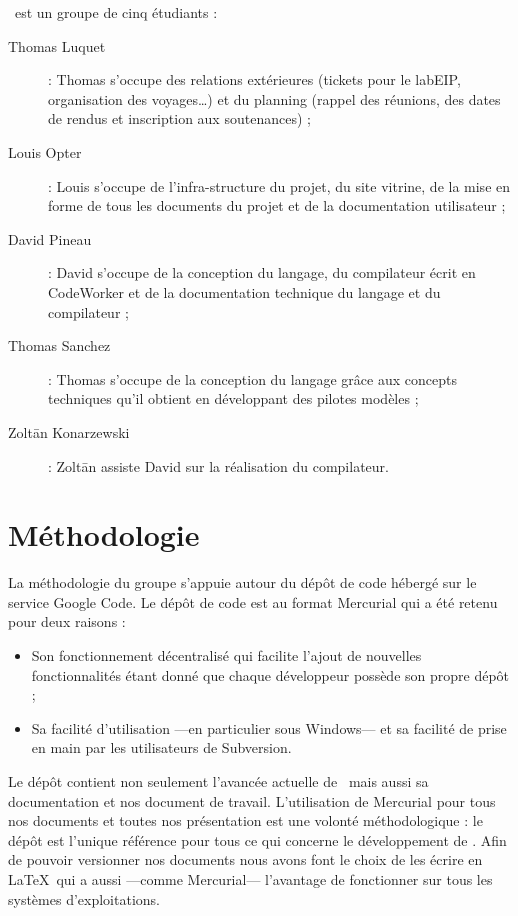 \documentclass[francais]{rtxreport}
\begin{document}
\rtx\ est un groupe de cinq étudiants :
\begin{description}
\item[Thomas Luquet] : Thomas s'occupe des relations extérieures (tickets pour
  le labEIP, organisation des voyages\ldots) et du planning (rappel des
  réunions, des dates de rendus et inscription aux soutenances) ;
\item[Louis Opter] : Louis s'occupe de l'infra-structure du projet, du site
  vitrine, de la mise en forme de tous les documents du projet et de la
  documentation utilisateur ;
\item[David Pineau] : David s'occupe de la conception du langage, du compilateur
  écrit en CodeWorker et de la documentation technique du langage et du
  compilateur ;
\item[Thomas Sanchez] : Thomas s'occupe de la conception du langage grâce aux
  concepts techniques qu'il obtient en développant des pilotes modèles ;
\item[Zolt\={a}n Konarzewski] : Zolt\={a}n assiste David sur la réalisation du
  compilateur.
\end{description}


\section{Méthodologie}

La méthodologie du groupe s'appuie autour du dépôt de code hébergé sur le
service Google Code. Le dépôt de code est au format Mercurial qui a été retenu
pour deux raisons :
\begin{itemize}
\item Son fonctionnement décentralisé qui facilite l'ajout de nouvelles
  fonctionnalités étant donné que chaque développeur possède son propre dépôt ;
\item Sa facilité d'utilisation ---en particulier sous Windows--- et sa facilité
  de prise en main par les utilisateurs de Subversion.
\end{itemize}

Le dépôt contient non seulement l'avancée actuelle de \rtx\ mais aussi sa
documentation et nos document de travail. L'utilisation de Mercurial pour tous
nos documents et toutes nos présentation est une volonté méthodologique : le
dépôt est l'unique référence pour tous ce qui concerne le développement de \rtx.
Afin de pouvoir versionner nos documents nous avons font le choix de les écrire
en \LaTeX\ qui a aussi ---comme Mercurial--- l'avantage de fonctionner sur tous
les systèmes d'exploitations.
\end{document}
